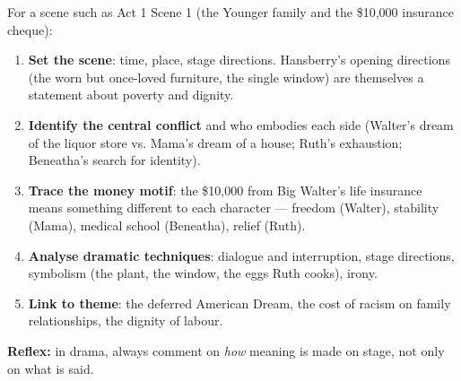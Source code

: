 \documentclass[11pt]{article}
\begin{document}
\begin{methode}
For a scene such as Act 1 Scene 1 (the Younger family and the \$10,000 insurance cheque):
\begin{enumerate}
\item \textbf{Set the scene}: time, place, stage directions. Hansberry's opening directions (the worn but once-loved furniture, the single window) are themselves a statement about poverty and dignity.
\item \textbf{Identify the central conflict} and who embodies each side (Walter's dream of the liquor store vs. Mama's dream of a house; Ruth's exhaustion; Beneatha's search for identity).
\item \textbf{Trace the money motif}: the \$10,000 from Big Walter's life insurance means something different to each character — freedom (Walter), stability (Mama), medical school (Beneatha), relief (Ruth).
\item \textbf{Analyse dramatic techniques}: dialogue and interruption, stage directions, symbolism (the plant, the window, the eggs Ruth cooks), irony.
\item \textbf{Link to theme}: the deferred American Dream, the cost of racism on family relationships, the dignity of labour.
\end{enumerate}
\textbf{Reflex:} in drama, always comment on \emph{how} meaning is made on stage, not only on what is said.
\end{methode}
\end{document}
